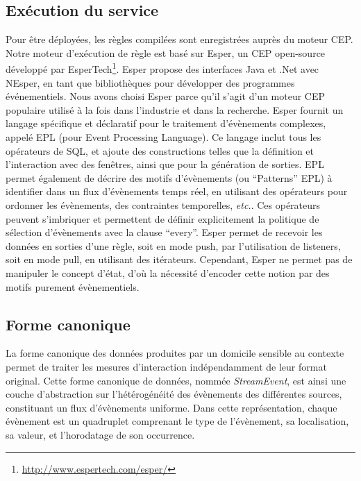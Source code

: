 \subsection{Exécution du service}
Pour être déployées, les règles compilées sont enregistrées auprès du moteur CEP. Notre moteur d'exécution de règle est basé sur Esper, un CEP open-source développé par EsperTech\footnote{\url{http://www.espertech.com/esper/}}. 
Esper propose des interfaces Java et .Net avec NEsper, en tant que bibliothèques pour développer des programmes 
événementiels. Nous avons choisi Esper parce qu'il s'agit d'un moteur CEP 
populaire utilisé à la fois dans l'industrie et dans la recherche. Esper fournit 
un langage spécifique et déclaratif pour le traitement d'évènements complexes, 
appelé EPL (pour Event Processing Language). 
Ce langage inclut tous les opérateurs de SQL, et ajoute des constructions telles que la définition et l'interaction avec des fenêtres, ainsi que pour la génération de sorties.
EPL permet également de décrire des motifs 
d'évènements (ou ``Patterns'' EPL) à identifier dans un flux d'évènements temps réel, en utilisant des 
opérateurs pour ordonner les évènements, des contraintes temporelles, {\em etc.}. Ces opérateurs peuvent s'imbriquer
et permettent de définir explicitement la politique de sélection d'évènements avec la clause ``every''. 
Esper permet de recevoir les données en sorties d'une règle, soit en mode push, par l'utilisation de listeners, soit en mode pull, en utilisant des itérateurs.
Cependant, Esper ne permet pas de manipuler le concept d'état, d'où la nécessité
d'encoder cette notion par des motifs purement évènementiels. 

\subsection{Forme canonique}
La forme canonique des données produites par un domicile sensible au contexte 
permet de traiter les mesures d'interaction indépendamment 
de leur format original. Cette forme canonique 
de données, nommée {\em StreamEvent}, est ainsi une couche d'abstraction sur l'hétérogénéité
des évènements des différentes sources, constituant un flux d'évènements uniforme. 
Dans cette représentation, chaque évènement est un 
quadruplet comprenant le type de l'évènement, sa localisation, sa valeur, et l'horodatage de son occurrence.


